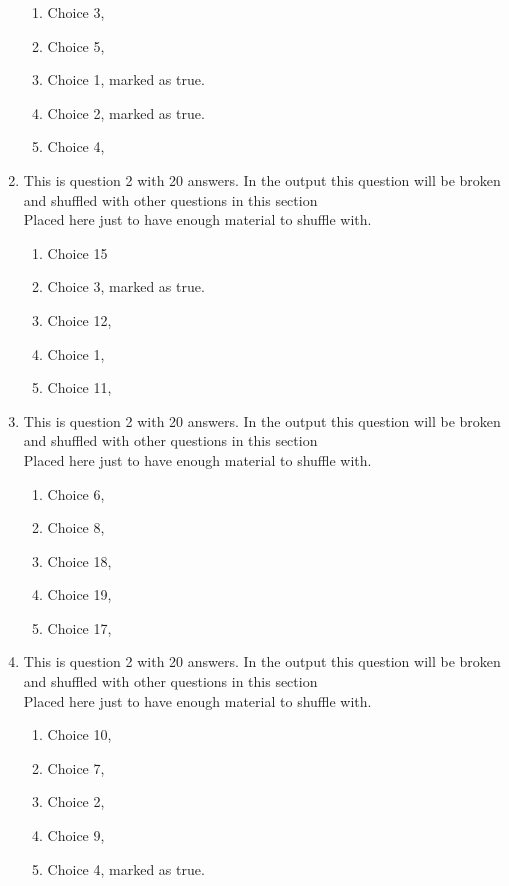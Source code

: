 \documentclass[a4paper,10pt]{article}%
\begin{document}
\begin{enumerate}[resume]
\begin{enumerate}
\item  Choice 3, 
		\item  Choice 5,
	\item  Choice 1, marked as true. %
		\item  Choice 2, marked as true. %
		\item  Choice 4,
		\end{enumerate}
\item  This is question 2 with 20 answers. In the output this question will be broken and shuffled with other questions in this section\\
	Placed here just to have enough material to shuffle with.
	
\begin{enumerate}
\item  Choice 15
		\item  Choice 3, marked as true. %
		\item  Choice 12,
		\item  Choice 1,
		\item  Choice 11,
		\end{enumerate}
\item  This is question 2 with 20 answers. In the output this question will be broken and shuffled with other questions in this section\\
	Placed here just to have enough material to shuffle with.
	
\begin{enumerate}
\item  Choice 6,
		\item  Choice 8,
		\item  Choice 18,
		\item  Choice 19,		
		\item  Choice 17,
		\end{enumerate}
\item  This is question 2 with 20 answers. In the output this question will be broken and shuffled with other questions in this section\\
	Placed here just to have enough material to shuffle with.
	
\begin{enumerate}
\item  Choice 10,
		\item  Choice 7,
		\item  Choice 2,
		\item  Choice 9,
		\item  Choice 4, marked as true. %
		\end{enumerate}
\end{enumerate}
\end{document}

